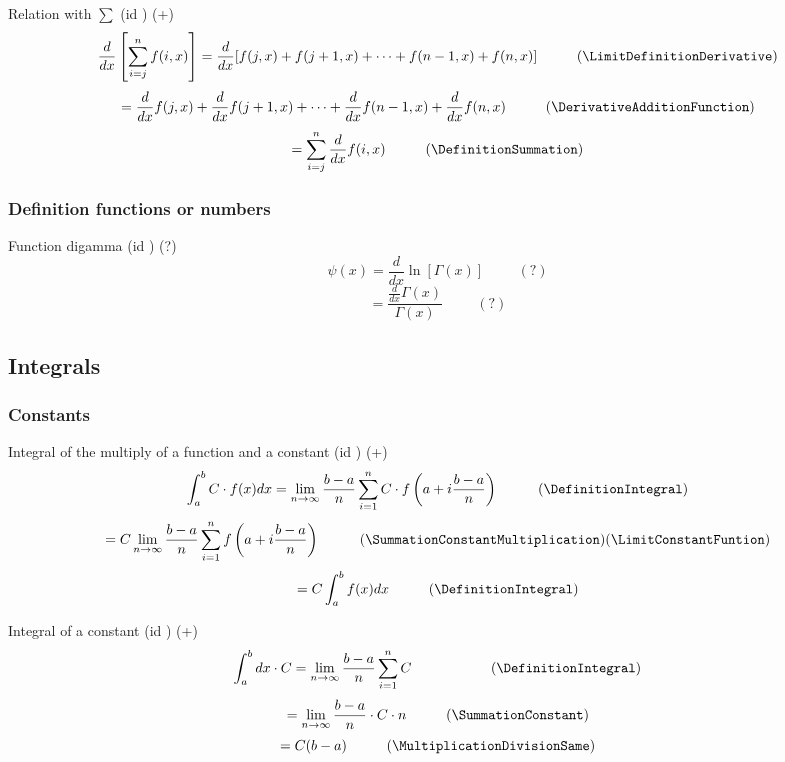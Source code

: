 \documentclass{book}
\begin{document}
                    Relation with $\sum$ (id \DerivateRelationSummation) (+)
                    \[\frac{d}{dx} \left[\sum^n_{i=j} f(i, x) \right] = \frac{d}{dx} [f(j, x) + f(j + 1, x) + \cdots + f(n - 1, x) + f(n, x)] \hspace{1cm} (\LimitDefinitionDerivative)\]
                    \[= \frac{d}{dx} f(j, x) + \frac{d}{dx} f(j + 1, x) + \cdots + \frac{d}{dx} f(n - 1, x) + \frac{d}{dx} f(n, x) \hspace{1cm} (\DerivativeAdditionFunction)\]
                    \[= \sum^n_{i=j} \frac{d}{dx} f(i, x) \hspace{1cm} (\DefinitionSummation)\]
                
                \subsubsection{Definition functions or numbers}
                    Function digamma (id \DerivativeFunctionDigamma) (?)
                    \[\psi(x) = \frac{d}{dx} \ln[\Gamma(x)] \hspace{1cm} (?)\]
                    \[= \frac{\frac{d}{dx} \Gamma(x)}{\Gamma(x)} \hspace{1cm} (?)\]

            \subsection{Integrals}
                \subsubsection{Constants}
                    Integral of the multiply of a function and a constant (id \IntegralMultiplyFunctionConstant) (+)
                    \[\int^b_a C \cdot f(x) dx = \lim_{n \rightarrow \infty} \frac{b - a}{n} \sum^n_{i=1} C \cdot f\left(a + i \frac{b - a}{n}\right) \hspace{1cm} (\DefinitionIntegral)\]
                    \[= C \lim_{n \rightarrow \infty} \frac{b - a}{n} \sum^n_{i=1} f \left(a + i\frac{b - a}{n}\right) \hspace{1cm} (\SummationConstantMultiplication)(\LimitConstantFuntion)\]
                    \[= C \int^b_a f(x) dx \hspace{1cm} (\DefinitionIntegral)\]

                    Integral of a constant (id \IntegralConstant) (+)
                    \[\int^b_a dx \cdot C = \lim_{n \rightarrow \infty} \frac{b - a}{n} \sum^n_{i=1} C \hspace{1cm} \hspace{1cm} (\DefinitionIntegral)\]
                    \[= \lim_{n \rightarrow \infty} \frac{b - a}{n} \cdot C \cdot n \hspace{1cm} (\SummationConstant)\]
                    \[= C(b - a) \hspace{1cm} (\MultiplicationDivisionSame)\]
\end{document}
